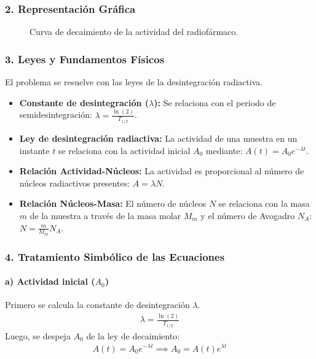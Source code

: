 \subsubsection*{2. Representación Gráfica}
\begin{figure}[H]
    \centering
    \caption{Curva de decaimiento de la actividad del radiofármaco.}
\end{figure}

\subsubsection*{3. Leyes y Fundamentos Físicos}
El problema se resuelve con las leyes de la desintegración radiactiva.
\begin{itemize}
    \item \textbf{Constante de desintegración ($\lambda$):} Se relaciona con el periodo de semidesintegración: $\lambda = \frac{\ln(2)}{T_{1/2}}$.
    \item \textbf{Ley de desintegración radiactiva:} La actividad de una muestra en un instante $t$ se relaciona con la actividad inicial $A_0$ mediante: $A(t) = A_0 e^{-\lambda t}$.
    \item \textbf{Relación Actividad-Núcleos:} La actividad es proporcional al número de núcleos radiactivos presentes: $A = \lambda N$.
    \item \textbf{Relación Núcleos-Masa:} El número de núcleos $N$ se relaciona con la masa $m$ de la muestra a través de la masa molar $M_m$ y el número de Avogadro $N_A$: $N = \frac{m}{M_m} N_A$.
\end{itemize}

\subsubsection*{4. Tratamiento Simbólico de las Ecuaciones}
\paragraph{a) Actividad inicial ($A_0$)}
Primero se calcula la constante de desintegración $\lambda$.
\begin{gather}
    \lambda = \frac{\ln(2)}{T_{1/2}}
\end{gather}
Luego, se despeja $A_0$ de la ley de decaimiento:
\begin{gather}
    A(t) = A_0 e^{-\lambda t} \implies A_0 = A(t) e^{\lambda t}
\end{gather}
